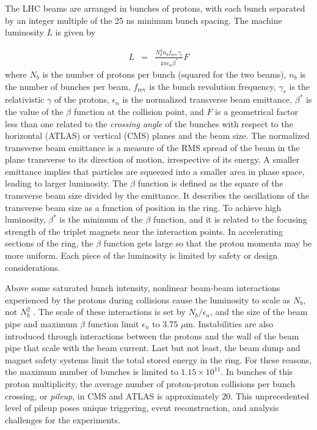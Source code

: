 \documentclass[dissertation.tex]{subfiles}
\begin{document}
The LHC beams are arranged in bunches of protons, with each bunch separated by an integer multiple of the 25 ns minimum bunch spacing.  The machine luminosity $L$ is given by

\begin{eqnarray}
L &=& \frac{N_{b}^{2}n_{b}f_{\mathrm{rev}}\gamma_{r}}{4\pi\epsilon_{n}\beta^{*}}F
\end{eqnarray}
%
where $N_{b}$ is the number of protons per bunch (squared for the two beams), $n_{b}$ is the number of bunches per beam, $f_{\mathrm{rev}}$ is the bunch revolution frequency, $\gamma_{r}$ is the relativistic $\gamma$ of the protons, $\epsilon_{n}$ is the normalized transverse beam emittance, $\beta^{*}$ is the value of the $\beta$ function at the collision point, and $F$ is a geometrical factor less than one related to the \textit{crossing angle} of the bunches with respect to the horizontal (ATLAS) or vertical (CMS) planes and the beam size.  The normalized transverse beam emittance is a measure of the RMS spread of the beam in the plane transverse to its direction of motion, irrespective of its energy.  A smaller emittance implies that particles are squeezed into a smaller area in phase space, leading to larger luminosity.  The $\beta$ function is defined as the square of the transverse beam size divided by the emittance.  It describes the oscillations of the transverse beam size as a function of position in the ring.  To achieve high luminosity, $\beta^{*}$ is the minimum of the $\beta$ function, and it is related to the focusing strength of the triplet magnets near the interaction points.  In accelerating sections of the ring, the $\beta$ function gets large so that the proton momenta may be more uniform.  Each piece of the luminosity is limited by safety or design considerations.

Above some saturated bunch intensity, nonlinear beam-beam interactions experienced by the protons during collisions cause the luminosity to scale as $N_{b}$, not $N_{b}^{2}$ \cite{Sun:1235160}.  The scale of these interactions is set by $N_{b}/\epsilon_{n}$, and the size of the beam pipe and maximum $\beta$ function limit $\epsilon_{n}$ to 3.75 $\mu\mbox{m}$.  Instabilities are also introduced through interactions between the protons and the wall of the beam pipe that scale with the beam current.  Last but not least, the beam dump and magnet safety systems limit the total stored energy in the ring.  For these reasons, the maximum number of bunches is limited to $1.15\times10^{11}$.  In bunches of this proton multiplicity, the average number of proton-proton collisions per bunch crossing, or \textit{pileup}, in CMS and ATLAS is approximately 20.  This unprecedented level of pileup poses unique triggering, event reconstruction, and analysis challenges for the experiments.
\end{document}
